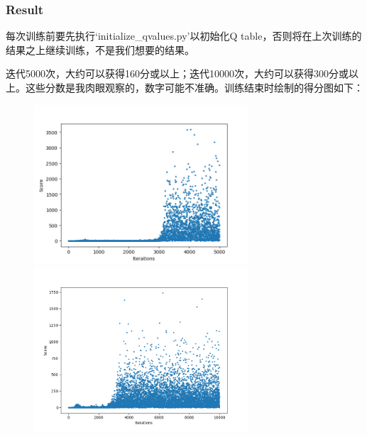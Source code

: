 \documentclass[a4paper, 11pt]{article}
\begin{document}
\subsubsection{Result}

每次训练前要先执行`initialize\_qvalues.py'以初始化Q table，否则将在上次训练的结果之上继续训练，不是我们想要的结果。

迭代5000次，大约可以获得160分或以上；迭代10000次，大约可以获得300分或以上。这些分数是我肉眼观察的，数字可能不准确。训练结束时绘制的得分图如下：

\begin{figure}[ht]
\centering
\includegraphics[width=8cm]{Pic/Figure_5000iter.png}
\quad
\includegraphics[width=8cm]{Pic/Figure_10000iter.png}
\end{figure}
	
%
%
\end{document}
